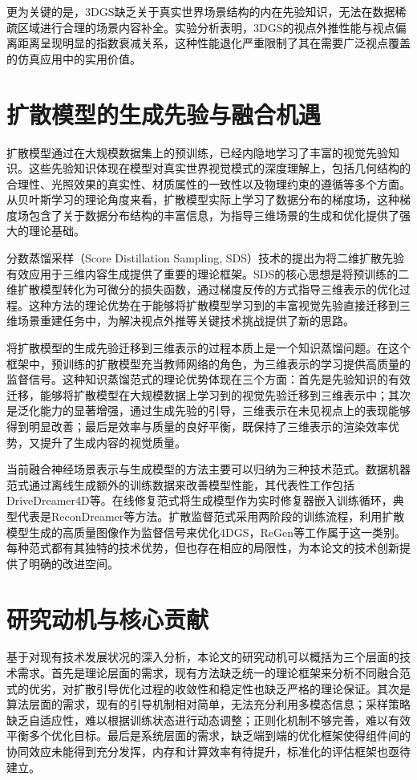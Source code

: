 更为关键的是，3DGS缺乏关于真实世界场景结构的内在先验知识，无法在数据稀疏区域进行合理的场景内容补全。实验分析表明，3DGS的视点外推性能与视点偏离距离呈现明显的指数衰减关系，这种性能退化严重限制了其在需要广泛视点覆盖的仿真应用中的实用价值。

\section{扩散模型的生成先验与融合机遇}

扩散模型通过在大规模数据集上的预训练，已经内隐地学习了丰富的视觉先验知识\cite{ho2020denoising}。这些先验知识体现在模型对真实世界视觉模式的深度理解上，包括几何结构的合理性、光照效果的真实性、材质属性的一致性以及物理约束的遵循等多个方面。从贝叶斯学习的理论角度来看，扩散模型实际上学习了数据分布的梯度场，这种梯度场包含了关于数据分布结构的丰富信息，为指导三维场景的生成和优化提供了强大的理论基础。

分数蒸馏采样（Score Distillation Sampling, SDS）技术的提出为将二维扩散先验有效应用于三维内容生成提供了重要的理论框架\cite{dreamfusion2022}。SDS的核心思想是将预训练的二维扩散模型转化为可微分的损失函数，通过梯度反传的方式指导三维表示的优化过程。这种方法的理论优势在于能够将扩散模型学习到的丰富视觉先验直接迁移到三维场景重建任务中，为解决视点外推等关键技术挑战提供了新的思路。

将扩散模型的生成先验迁移到三维表示的过程本质上是一个知识蒸馏问题。在这个框架中，预训练的扩散模型充当教师网络的角色，为三维表示的学习提供高质量的监督信号。这种知识蒸馏范式的理论优势体现在三个方面：首先是先验知识的有效迁移，能够将扩散模型在大规模数据上学习到的视觉先验迁移到三维表示中；其次是泛化能力的显著增强，通过生成先验的引导，三维表示在未见视点上的表现能够得到明显改善；最后是效率与质量的良好平衡，既保持了三维表示的渲染效率优势，又提升了生成内容的视觉质量。

当前融合神经场景表示与生成模型的方法主要可以归纳为三种技术范式。数据机器范式通过离线生成额外的训练数据来改善模型性能，其代表性工作包括DriveDreamer4D等。在线修复范式将生成模型作为实时修复器嵌入训练循环，典型代表是ReconDreamer等方法。扩散监督范式采用两阶段的训练流程，利用扩散模型生成的高质量图像作为监督信号来优化4DGS，ReGen等工作属于这一类别。每种范式都有其独特的技术优势，但也存在相应的局限性，为本论文的技术创新提供了明确的改进空间。

\section{研究动机与核心贡献}

基于对现有技术发展状况的深入分析，本论文的研究动机可以概括为三个层面的技术需求。首先是理论层面的需求，现有方法缺乏统一的理论框架来分析不同融合范式的优劣，对扩散引导优化过程的收敛性和稳定性也缺乏严格的理论保证。其次是算法层面的需求，现有的引导机制相对简单，无法充分利用多模态信息；采样策略缺乏自适应性，难以根据训练状态进行动态调整；正则化机制不够完善，难以有效平衡多个优化目标。最后是系统层面的需求，缺乏端到端的优化框架使得组件间的协同效应未能得到充分发挥，内存和计算效率有待提升，标准化的评估框架也亟待建立。

